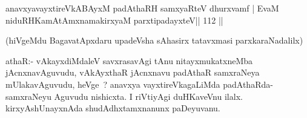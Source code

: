 \begin{shl}
anavxyavayxtireVkABAyxM padAthaRH samxyaRteV dhurxvamf |
EvaM niduRHKamAtAmxnamakirxyaM parxtipadayxteV\hfill || 112 ||
\end{shl}

\begin{artha}
(hiVgeMdu BagavatApxdaru upadeVsha sAhasirx tatavxmasi
  parxkaraNadalilx) 
\end{artha}

\begin{artha}
athaR:- vAkayxdiMdaleV savxrasavAgi tAnu nitayxmukatxneMba jAcnxnavAguvudu, vAkAyxthaR jAcnxnavu padAthaR samxraNeya mUlakavAguvudu, heVge~? anavxya vayxtireVkagaLiMda padAthaRda-samxraNeyu Aguvudu nishicxta. I riVtiyAgi duHKaveVnu ilalx. kirxyAshUnayxnAda shudAdhxtamxnanunx paDeyuvanu.
\end{artha}

\centerline{}


